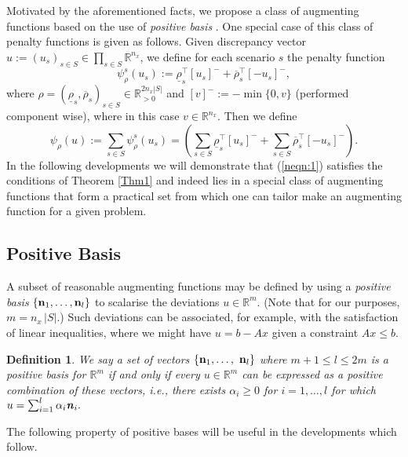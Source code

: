 \documentclass[preprint, 1p, review]{elsarticle}
\newtheorem{definition}[theorem]{Definition}
\newcommand{\bfemph}[1]{\textbf{\emph{#1}}}
\begin{document}
Motivated by the aforementioned facts, we propose a class of augmenting functions based on the use of {\em positive basis} \cite{Davis1954}. 
One special case of this class of penalty functions is given as follows.
Given discrepancy vector $u:=(u_s)_{s \in S} \in \prod_{s \in S} \mathbb{R}^{n_x}$, we define for each scenario $s$ the penalty function 
$$\psi_{\rho}^s(u_s):=\underline{\rho}_s^\top[u_s]^- +  \overline{\rho}_s^\top [-u_s]^-,$$
where $\rho = (\underline{\rho}_s, \overline{\rho}_s)_{s \in S} \in \mathbb{R}^{2n_x |S|}_{>0}$ and $[ v ]^- :=  -\min\{0,  v \} $ (performed component wise), where in this case $v \in \mathbb{R}^{n_x}$.
Then we define
%
\begin{equation}
\psi_\rho(u):=\sum_{s \in S} \psi_{\rho}^s(u_s) = \left(\sum_{s \in S}\underline{\rho}_s^\top[u_s]^- +  \sum_{s \in S}\overline{\rho}_s^\top [-u_s]^-\right). \label{neqn:1}
\end{equation}
%
In the following developments we will demonstrate that (\ref{neqn:1}) satisfies the conditions of Theorem \ref{Thm1} and indeed lies in a special class of augmenting functions that form a practical set from which one can tailor make an augmenting function for a given problem. 

\subsection{Positive Basis}

A subset of reasonable augmenting functions may be defined by using a \emph{positive basis} $\{\text{\bf n}_1, \dots, \text{\bf n}_l\}$ to scalarise the deviations $u\in \mathbb{R}^{m}$. (Note that for our purposes, $m=n_x \,| S | $.)
Such deviations can be associated, for example, with the satisfaction of linear inequalities, where we might have $u=b-Ax$ given a constraint $Ax \le b$.%

\begin{definition}
	We say a set of vectors $\left\{ \text{\bf n}_{1},\dots ,\ \text{\bf n}_{l}\right\}$ where ${m} +1\leq l \leq 2{m}  $ is a \emph{positive basis} for $\mathbb{R}^{m}$ if and only if every $u \in \mathbb{R}^{{m}}$ can be expressed as a positive combination of these vectors, i.e., there exists $\alpha_{i}\geq 0$ for $i=1,\dots ,l$ for which $u=\sum_{i=1}^{l}\alpha _{i}\bfemph{n}_{i}.$
\end{definition}

The following property of positive bases will be useful in the developments which follow.
\end{document}
